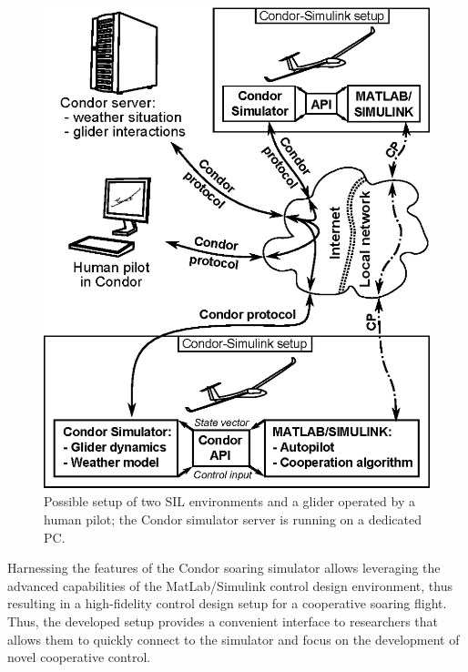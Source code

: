 \documentclass[letterpaper, 10 pt, conference]{ieeeconf}  %
\begin{document}
\begin{figure}[thpb]
  \centering
  \includegraphics[scale=0.45]{Figures/dev_env_.eps}
  \caption{Possible setup of two SIL environments and a glider operated by a human pilot; the Condor simulator server is running on a dedicated PC.}
  \label{fig:DevEnv}
\end{figure}

Harnessing the features of the Condor soaring simulator allows leveraging the advanced capabilities of the MatLab/Simulink control design environment, thus resulting in a high-fidelity control design setup for a cooperative soaring flight. Thus, the developed setup provides a convenient interface to researchers that allows them to quickly connect to the simulator and focus on the development of novel cooperative control.
\end{document}
